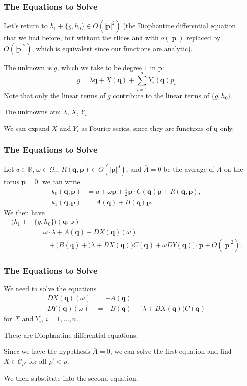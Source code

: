 \documentclass{beamer}
\newcommand{\R}{\mathbb{R}}
\newcommand{\bp}[1]{\bm{#1}}
\begin{document}
\begin{frame}
  \frametitle{The Equations to Solve}
  Let's return to $h_1 + \{g, h_0\} \in O(|\bp{p}|^2)$ (the Diophantine differential
  equation that we had before, but without the tildes and with $o(|\bp{p}|)$
  replaced by $O(|\bp{p}|^2)$, which is equivalent since our functions are
  analytic).

  The unknown is $g$, which we take to be degree $1$ in $\bp{p}$:
  \begin{equation*}
    g = \lambda \bp{q} + X(\bp{q}) + \sum_{i = 1}^n Y_i(\bp{q}) p_i
  \end{equation*}
  Note that only the linear terms of $g$ contribute to the linear terms of $\{g,
  h_0\}$.

  The unknowns are: $\lambda$, $X$, $Y_i$.

  We can expand $X$ and $Y_i$ as Fourier series, since they are functions of
  $\bp{q}$ only.
\end{frame}

\begin{frame}
  \frametitle{The Equations to Solve}
  Let $a \in \R$, $\omega \in \Omega_{\gamma}$,
  $R(\bp{q}, \bp{p}) \in O(|\bp{p}|^3)$, and $\overline{A} = 0$ be the average
  of $A$ on the torus $\bp{p} = 0$, we can write
  \begin{align*}
    h_0(\bp{q}, \bp{p}) &= a + \omega \bp{p} + \frac{1}{2} \bp{p} \cdot
                          C(\bp{q}) \bp{p} + R(\bp{q}, \bp{p}),\\
    h_1(\bp{q}, \bp{p}) &= A(\bp{q}) + B(\bp{q}) \bp{p}.
  \end{align*}
  We then have
  \begin{align*}
    (h_1 + &\{g, h_0\}) (\bp{q}, \bp{p})\\
           &= \omega \cdot \lambda + A(\bp{q}) + DX(\bp{q})(\omega)\\
           &\qquad + \Big(B(\bp{q}) + \big( \lambda + DX(\bp{q}) \big) C(\bp{q}) +
             \omega DY(\bp{q}) \Big) \cdot \bp{p} + O(|\bp{p}|^2).
  \end{align*}

\end{frame}

\begin{frame}
  \frametitle{The Equations to Solve}
  We need to solve the equations
  \begin{align*}
    DX(\bp{q})(\omega) &= -A(\bp{q})\\
    DY(\bp{q})(\omega) &= -B(\bp{q}) - \big( \lambda + DX(\bp{q}) \big)
                C(\bp{q})
  \end{align*}
  for $X$ and $Y_i$, $i = 1, \ldots, n$.

  These are Diophantine differential equations.

  Since we have the hypothesis $\overline{A} = 0$, we can solve the first
  equation and find $X \in \mathcal{C}_{\rho'}$ for all $\rho' < \rho$.

  We then substitute into the second equation.
\end{frame}
\end{document}
